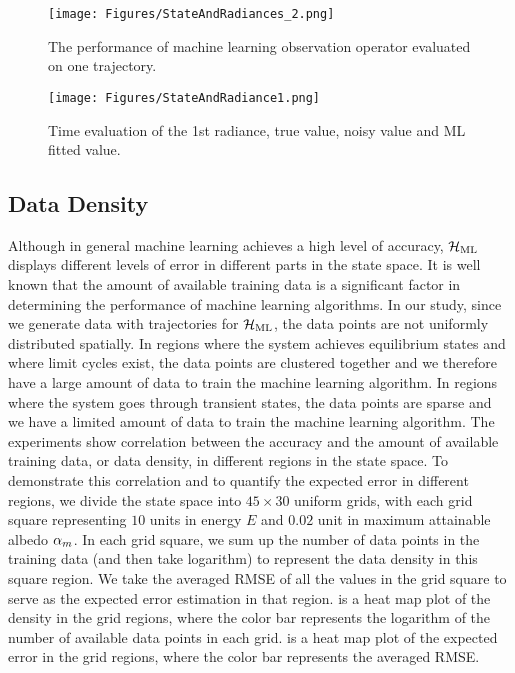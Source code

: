 \begin{figure}\label{fig:MLevaluation}
\begin{center}
\texttt{[image: Figures/StateAndRadiances\_2.png]} 
\end{center}
\caption{The performance of machine learning observation operator evaluated on one trajectory.}
\end{figure}

\begin{figure}\label{fig:MLrad1}
\begin{center}
\texttt{[image: Figures/StateAndRadiance1.png]} 
\end{center}
\caption{Time evaluation of the 1st radiance, true value, noisy value and ML fitted value.}
\end{figure}

\subsection{Data Density}\label{sec:DataDensity}
\par Although in general machine learning achieves a high level of accuracy, $\mathcal{H}_{\text{ML}}$ displays different levels of error in different parts in the state space. It is well known that the amount of available training data is a significant factor in determining the performance of machine learning algorithms. In our study, since we generate data with trajectories for $\mathcal{H}_{\text{ML}}$, the data points are not uniformly distributed spatially. In regions where the system achieves equilibrium states and where limit cycles exist, the data points are clustered together and we therefore have a large amount of data to train the machine learning algorithm. In regions where the system goes through transient states, the data points are sparse and we have a limited amount of data to train the machine learning algorithm. The experiments show correlation between the accuracy and the amount of available training data, or data density, in different regions in the state space. To demonstrate this correlation and to quantify the expected error in different regions, we divide the state space into $45\times 30$ uniform grids, with each grid square representing $10$ units in energy $E$ and $0.02$ unit in maximum attainable albedo $\alpha_m$. In each grid square, we sum up the number of data points in the training data (and then take logarithm) to represent the data density in this square region. We take the averaged RMSE of all the values in the grid square to serve as the expected error estimation in that region.  is a heat map plot of the density in the grid regions, where the color bar represents the logarithm of the number of available data points in each grid.  is a heat map plot of the expected error in the grid regions, where the color bar represents the averaged RMSE.

